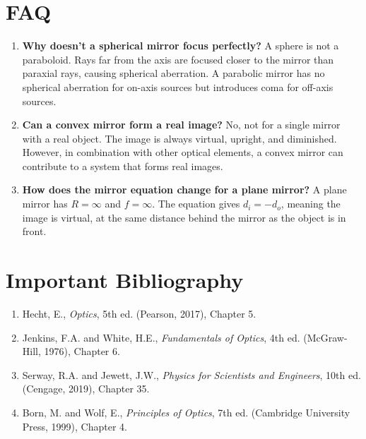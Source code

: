 \section*{FAQ}

\begin{enumerate}
\item \textbf{Why doesn't a spherical mirror focus perfectly?}
A sphere is not a paraboloid. Rays far from the axis are focused closer to the mirror than paraxial rays, causing spherical aberration. A parabolic mirror has no spherical aberration for on-axis sources but introduces coma for off-axis sources.

\item \textbf{Can a convex mirror form a real image?}
No, not for a single mirror with a real object. The image is always virtual, upright, and diminished. However, in combination with other optical elements, a convex mirror can contribute to a system that forms real images.

\item \textbf{How does the mirror equation change for a plane mirror?}
A plane mirror has $R = \infty$ and $f = \infty$. The equation gives $d_{i} = -d_{o}$, meaning the image is virtual, at the same distance behind the mirror as the object is in front.
\end{enumerate}
\section*{Important Bibliography}

\begin{enumerate}
\item Hecht, E., \textit{Optics}, 5th ed. (Pearson, 2017), Chapter 5.
\item Jenkins, F.A. and White, H.E., \textit{Fundamentals of Optics}, 4th ed. (McGraw-Hill, 1976), Chapter 6.
\item Serway, R.A. and Jewett, J.W., \textit{Physics for Scientists and Engineers}, 10th ed. (Cengage, 2019), Chapter 35.
\item Born, M. and Wolf, E., \textit{Principles of Optics}, 7th ed. (Cambridge University Press, 1999), Chapter 4.
\end{enumerate}

